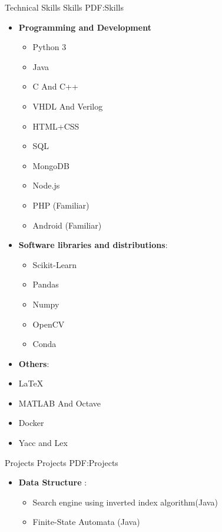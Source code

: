 \documentclass[letterpaper,MMMyyyy,nonstopmode]{simpleresumecv}
\begin{document}
\begin{Body}
\Gap



\Section
{Technical Skills}
{Skills}
{PDF:Skills}

\Entry

\begin{itemize}
\item \textbf {Programming and Development}
\begin{itemize}
    \item Python 3
    \item Java
    \item C And C++
	\item VHDL And Verilog 
    \item HTML+CSS
	\item SQL 
	\item MongoDB
    \item Node.js
	\item PHP (Familiar)
	\item Android (Familiar)
	
	
\end{itemize}


    \item \textbf{ Software libraries and distributions}: 
    \begin{itemize}
        \item Scikit-Learn
        \item Pandas
        \item Numpy
        \item OpenCV
        \item Conda
     \end{itemize}
     




 \item \textbf{Others}: 
\item{\LaTeX}
\item MATLAB And Octave
\item Docker
\item Yacc and Lex
	

\end{itemize}







\Section
{Projects}
{Projects}
{PDF:Projects}

\Entry
\begin{itemize}
	\item \textbf{Data Structure} :
		\begin{itemize}
		\item	Search engine using inverted index algorithm(Java)
	     \item  Finite-State Automata (Java)
		\end{itemize}
		

\end{itemize}
\end{Body}
\end{document}
